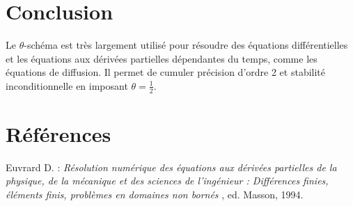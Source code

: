 \documentclass[a4paper, 12pt]{article}
\begin{document}

%

\section{Conclusion}
           
Le  $\theta$-schéma est très largement utilisé pour résoudre  des équations différentielles
et les équations aux dérivées partielles
dépendantes du temps, comme les équations de diffusion. Il permet de cumuler précision
d'ordre 2 et stabilité inconditionnelle en imposant $\theta = \frac{1}{2}$. \\
 
\vspace{-0.5cm}
\section{Références}

\noindent Euvrard D. : {\it Résolution numérique des équations aux dérivées partielles de la physique, de la mécanique et des sciences de l'ingénieur : Différences finies, éléments finis, problèmes en domaines non bornés }, ed. Masson, 1994.
\end{document}
